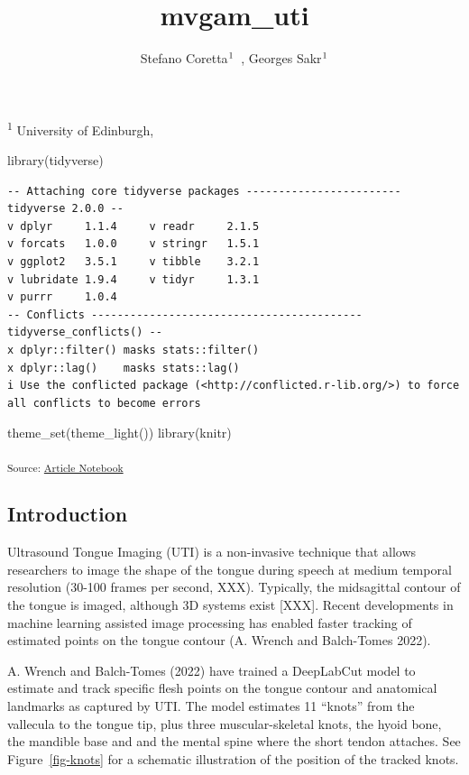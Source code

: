 \documentclass[
]{interact}
\title{mvgam\_uti}
\author{Stefano
Coretta$\textsuperscript{1}$~\orcidlink{0000-0001-9627-5532}, Georges
Sakr$\textsuperscript{1}$}
\newenvironment{Shaded}{\begin{snugshade}}{\end{snugshade}}
\newcommand{\FunctionTok}[1]{\textcolor[rgb]{0.28,0.35,0.67}{#1}}
\newcommand{\NormalTok}[1]{\textcolor[rgb]{0.00,0.23,0.31}{#1}}
\begin{document}
\captionsetup{labelsep=space}
\maketitle
\textsuperscript{1}  University of Edinburgh,  


\begin{Shaded}
\begin{Highlighting}[]
\FunctionTok{library}\NormalTok{(tidyverse)}
\end{Highlighting}
\end{Shaded}

\begin{verbatim}
-- Attaching core tidyverse packages ------------------------ tidyverse 2.0.0 --
v dplyr     1.1.4     v readr     2.1.5
v forcats   1.0.0     v stringr   1.5.1
v ggplot2   3.5.1     v tibble    3.2.1
v lubridate 1.9.4     v tidyr     1.3.1
v purrr     1.0.4     
-- Conflicts ------------------------------------------ tidyverse_conflicts() --
x dplyr::filter() masks stats::filter()
x dplyr::lag()    masks stats::lag()
i Use the conflicted package (<http://conflicted.r-lib.org/>) to force all conflicts to become errors
\end{verbatim}

\begin{Shaded}
\begin{Highlighting}[]
\FunctionTok{theme\_set}\NormalTok{(}\FunctionTok{theme\_light}\NormalTok{())}
\FunctionTok{library}\NormalTok{(knitr)}
\end{Highlighting}
\end{Shaded}

\textsubscript{Source:
\href{https://stefanocoretta.github.io/mv_uti/index.qmd.html}{Article
Notebook}}

\subsection{Introduction}\label{introduction}

Ultrasound Tongue Imaging (UTI) is a non-invasive technique that allows
researchers to image the shape of the tongue during speech at medium
temporal resolution (30-100 frames per second, XXX). Typically, the
midsagittal contour of the tongue is imaged, although 3D systems exist
{[}XXX{]}. Recent developments in machine learning assisted image
processing has enabled faster tracking of estimated points on the tongue
contour (A. Wrench and Balch-Tomes 2022).

A. Wrench and Balch-Tomes (2022) have trained a DeepLabCut model to
estimate and track specific flesh points on the tongue contour and
anatomical landmarks as captured by UTI. The model estimates 11
``knots'' from the vallecula to the tongue tip, plus three
muscular-skeletal knots, the hyoid bone, the mandible base and and the
mental spine where the short tendon attaches. See Figure~\ref{fig-knots}
for a schematic illustration of the position of the tracked knots.
\end{document}
